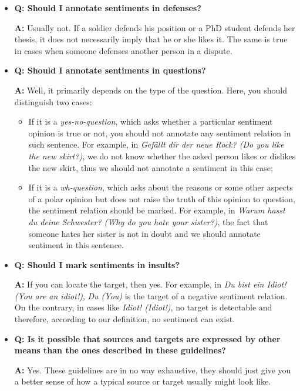 \documentclass[11pt,a4paper]{article}
\begin{document}
\begin{itemize}
\item\textbf{Q: Should I annotate sentiments in defenses?}

  \textbf{A:} Usually not.  If a soldier defends his position or a PhD
  student defends her thesis, it does not necessarily imply that he or
  she likes it.  The same is true in cases when someone defenses
  another person in a dispute.

\item\textbf{Q: Should I annotate sentiments in questions?}

  \textbf{A:} Well, it primarily depends on the type of the question.
  Here, you should distinguish two cases:
  \begin{itemize}
    \item If it is a \textit{yes-no-question}, which asks whether a
      particular sentiment opinion is true or not, you should not
      annotate any sentiment relation in such sentence.  For example,
      in \textit{Gef\"allt dir der neue Rock?  (Do you like the new
        skirt?)}, we do not know whether the asked person likes or
      dislikes the new skirt, thus we should not annotate a sentiment
      in this case;
    \item If it is a \textit{wh-question}, which asks about the
      reasons or some other aspects of a polar opinion but does not
      raise the truth of this opinion to question, the sentiment
      relation should be marked.  For example, in \textit{Warum hasst
        du deine Schwester? (Why do you hate your sister?)}, the fact
      that someone hates her sister is not in doubt and we should
      annotate sentiment in this sentence.
  \end{itemize}

\item\textbf{Q: Should I mark sentiments in insults?}

  \textbf{A:} If you can locate the target, then yes.  For example, in
  \textit{Du bist ein Idiot! (You are an idiot!)}, \textit{Du (You)}
  is the target of a negative sentiment relation.  On the contrary, in
  cases like \textit{Idiot!  (Idiot!)}, no target is detectable and
  therefore, according to our definition, no sentiment can exist.

\item\textbf{Q: Is it possible that sources and targets are expressed
  by other means than the ones described in these guidelines?}

  \textbf{A:} Yes. These guidelines are in no way exhaustive, they
  should just give you a better sense of how a typical source or
  target usually might look like.


\end{itemize}
\end{document}
